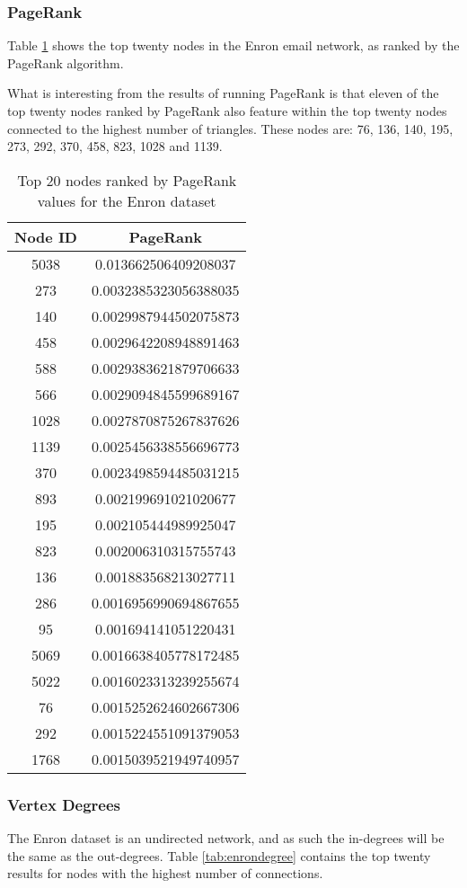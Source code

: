 \subsubsection{PageRank}
Table \ref{tab:enronpagerank} shows the top twenty nodes in the Enron email network, as ranked by the PageRank algorithm.

What is interesting from the results of running PageRank is that eleven of the top twenty nodes ranked by PageRank also feature within the top twenty nodes connected to the highest number of triangles. These nodes are: 76, 136, 140, 195, 273, 292, 370, 458, 823, 1028 and 1139.

\begin{table}%
\centering
\begin{tabular}{|c|c|}
\hline
Node ID & PageRank \\
\hline
5038 & 0.013662506409208037 \\
273 & 0.0032385323056388035 \\
140 & 0.0029987944502075873 \\
458 & 0.0029642208948891463 \\
588 & 0.0029383621879706633 \\
566 & 0.0029094845599689167 \\
1028 & 0.0027870875267837626 \\
1139 & 0.0025456338556696773 \\
370 & 0.0023498594485031215 \\
893 & 0.002199691021020677 \\
195 & 0.002105444989925047 \\
823 & 0.002006310315755743 \\
136 & 0.001883568213027711 \\
286 & 0.0016956990694867655 \\
95 & 0.001694141051220431 \\
5069 & 0.0016638405778172485 \\
5022 & 0.0016023313239255674 \\
76 & 0.0015252624602667306 \\
292 & 0.0015224551091379053 \\
1768 & 0.0015039521949740957 \\
\hline
\end{tabular}
\caption{Top 20 nodes ranked by PageRank values for the Enron dataset}
\label{tab:enronpagerank}
\end{table}

\subsubsection{Vertex Degrees}
The Enron dataset is an undirected network, and as such the in-degrees will be the same as the out-degrees. Table \ref{tab:enrondegree} contains the top twenty results for nodes with the highest number of connections.

